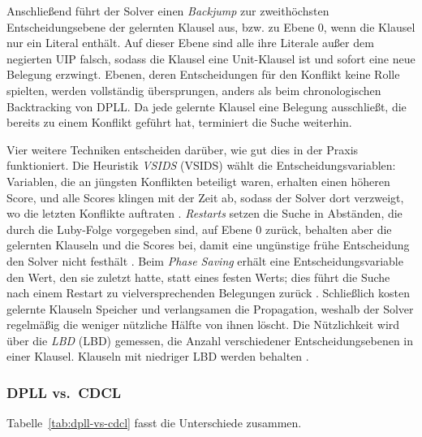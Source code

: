 Anschließend führt der Solver einen \emph{Backjump} zur zweithöchsten Entscheidungsebene der gelernten Klausel aus, bzw. zu Ebene 0, wenn die Klausel nur ein Literal enthält.
Auf dieser Ebene sind alle ihre Literale außer dem negierten \acs{UIP} falsch, sodass die Klausel eine Unit-Klausel ist und sofort eine neue Belegung erzwingt.
Ebenen, deren Entscheidungen für den Konflikt keine Rolle spielten, werden vollständig übersprungen, anders als beim chronologischen Backtracking von DPLL.
Da jede gelernte Klausel eine Belegung ausschließt, die bereits zu einem Konflikt geführt hat, terminiert die Suche weiterhin.

Vier weitere Techniken entscheiden darüber, wie gut dies in der Praxis funktioniert.
Die Heuristik \emph{\acl{VSIDS}} (\acs{VSIDS}) wählt die Entscheidungsvariablen: Variablen, die an jüngsten Konflikten beteiligt waren, erhalten einen höheren Score, und alle Scores klingen mit der Zeit ab, sodass der Solver dort verzweigt, wo die letzten Konflikte auftraten .
\emph{Restarts} setzen die Suche in Abständen, die durch die Luby-Folge vorgegeben sind, auf Ebene 0 zurück, behalten aber die gelernten Klauseln und die Scores bei, damit eine ungünstige frühe Entscheidung den Solver nicht festhält \parencites[vgl.][532]{moskewicz2001}[178]{luby1993}.
Beim \emph{Phase Saving} erhält eine Entscheidungsvariable den Wert, den sie zuletzt hatte, statt eines festen Werts; dies führt die Suche nach einem Restart zu vielversprechenden Belegungen zurück .
Schließlich kosten gelernte Klauseln Speicher und verlangsamen die Propagation, weshalb der Solver regelmäßig die weniger nützliche Hälfte von ihnen löscht.
Die Nützlichkeit wird über die \emph{\acl{LBD}} (\acs{LBD}) gemessen, die Anzahl verschiedener Entscheidungsebenen in einer Klausel. Klauseln mit niedriger \acs{LBD} werden behalten .

\subsubsection{DPLL vs.\ CDCL} \label{sec:comparison}

Tabelle~\ref{tab:dpll-vs-cdcl} fasst die Unterschiede zusammen.

